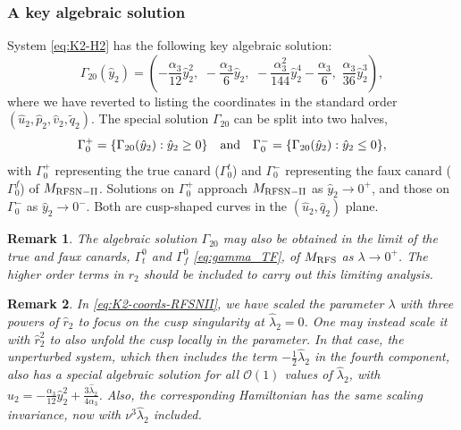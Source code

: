 \documentclass[11pt]{article}
\numberwithin{equation}{section}
\newtheorem{remark}{Remark}[section]
\begin{document}
\subsubsection{A key algebraic solution}\label{subsubsec:Gamma20}

System \eqref{eq:K2-H2} has the following key algebraic solution:
\begin{equation} \label{eq:Gamma_20}
    \Gamma_{20} (\hat{y}_2) 
    = \left( 
    -\frac{\alpha_3}{12} \hat{y}_2^2, \, \,  
    -\frac{\alpha_3}{6} \hat{y}_2, \, \,  
    -\frac{\alpha_3^2}{144}\hat{y}_2^4 - \frac{\alpha_3}{6}, \, \,  
    \frac{\alpha_3}{36}\hat{y}_2^3
    \right),
\end{equation}
%
where we have reverted to listing the coordinates in the standard order $(\hat u_2, \hat p_2, \hat v_2, \tilde q_2)$.
The special solution $\Gamma_{20}$ can be split into two halves,
%
\begin{equation}
        \Gamma_0^+ = \{ \Gamma_{20}(\hat{y}_2) : \hat{y}_2 \ge 0 \} 
        \quad {\rm and} \quad 
          \Gamma_0^- = \{ \Gamma_{20}(\hat{y}_2) :  \hat{y}_2 \le  0\},
\end{equation}
%
with $\Gamma_{0}^+$ representing the true canard ($\Gamma_0^t$) and $\Gamma_0^-$ representing the faux canard ($\Gamma_0^f$) of $M_{\rm RFSN-II}$.
Solutions on $\Gamma_0^+$ approach $M_{\rm RFSN-II}$ as $\hat{y}_2 \to 0^+$,
and those on $\Gamma_0^-$ as $\hat{y}_2 \to 0^-$.
Both are cusp-shaped curves in the $(\hat{u}_2,\hat{q}_2)$ plane.

\begin{remark}
The algebraic solution $\Gamma_{20}$ may also be obtained in the limit of the true and faux canards, $\Gamma_t^0$ and $\Gamma_f^0$ \eqref{eq:gamma_TF}, of $M_{\rm RFS}$ as $\lambda\to 0^+$. 
The higher order terms in $r_2$ should be included to carry out this limiting analysis.
\end{remark}

\begin{remark}
In \eqref{eq:K2-coords-RFSNII}, we have scaled the parameter $\lambda$ with three powers of $\hat{r}_2$ to focus on the cusp singularity at $\hat{\lambda}_2=0$.
One may instead scale it with $\hat{r}_2^2$ to also unfold the cusp locally in the parameter.
In that case, the unperturbed system, which then includes the term $-\tfrac{1}{2}\hat{\lambda}_2$ in the fourth component, also has a special algebraic solution for all $\mathcal{O}(1)$ values of $\hat{\lambda}_2$, with $\hat{u}_2=-\tfrac{\alpha_3}{12}\hat{y}_2^2 + \tfrac{3\hat{\lambda}_2}{4\alpha_3}$.
Also, the corresponding Hamiltonian has the same scaling invariance, now with $\nu^3 \hat{\lambda}_2$ included.
\end{remark}
\end{document}
